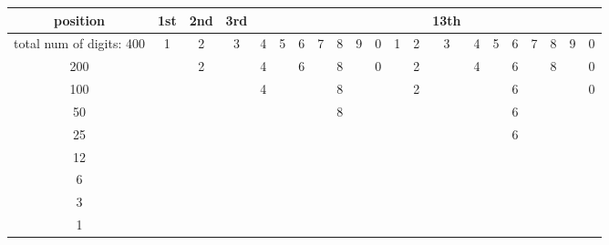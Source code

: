 %
%



\begin{tabular}[b]{c | c c c c c c c c c c c c c c c c c c c c }
position&1st&2nd&3rd&&&&&&&&&&13th\\ \hline
total num of digits: 400&1&2&3&4&5&6&7&8&9&0&1&2&3&4&5&6&7&8&9&0\\
200& &2&&4&&6&&8&&0&&2&&4&&6&&8&&0\\
100& &&&4&&&&8&&&&2&&&&6&&&&0\\
50& &&&&&&&8&&&&&&&&6&&&&\\
25& &&&&&&&&&&&&&&&6&&&&\\
12\\
6\\
3\\
1\\
\end{tabular}



%